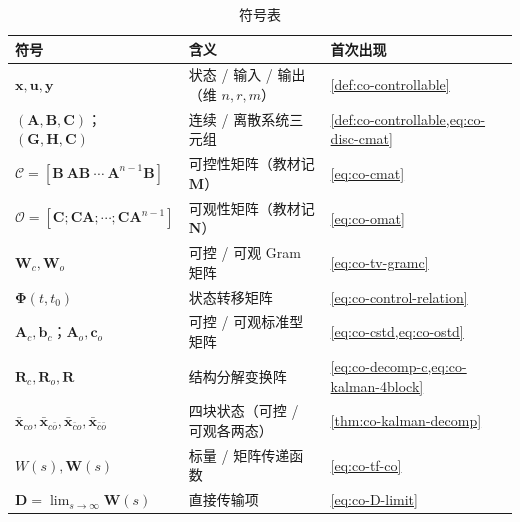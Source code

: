 \begin{table}[H]\centering\small
\caption{符号表}
\begin{tabular}{lll}
\toprule
符号 & 含义 & 首次出现 \\
\midrule
$\mathbf{x},\mathbf{u},\mathbf{y}$ & 状态 / 输入 / 输出（维 $n,r,m$） & \cref{def:co-controllable} \\
$(\mathbf{A},\mathbf{B},\mathbf{C})$；$(\mathbf{G},\mathbf{H},\mathbf{C})$ & 连续 / 离散系统三元组 & \cref{def:co-controllable,eq:co-disc-cmat} \\
$\mathcal{C}=[\mathbf{B}\ \mathbf{A}\mathbf{B}\ \cdots\ \mathbf{A}^{n-1}\mathbf{B}]$ & 可控性矩阵（教材记 $\mathbf{M}$） & \cref{eq:co-cmat} \\
$\mathcal{O}=[\mathbf{C};\mathbf{C}\mathbf{A};\cdots;\mathbf{C}\mathbf{A}^{n-1}]$ & 可观性矩阵（教材记 $\mathbf{N}$） & \cref{eq:co-omat} \\
$\mathbf{W}_c,\mathbf{W}_o$ & 可控 / 可观 Gram 矩阵 & \cref{eq:co-tv-gramc} \\
$\boldsymbol{\Phi}(t,t_0)$ & 状态转移矩阵 & \cref{eq:co-control-relation} \\
$\mathbf{A}_c,\mathbf{b}_c$；$\mathbf{A}_o,\mathbf{c}_o$ & 可控 / 可观标准型矩阵 & \cref{eq:co-cstd,eq:co-ostd} \\
$\mathbf{R}_c,\mathbf{R}_o,\mathbf{R}$ & 结构分解变换阵 & \cref{eq:co-decomp-c,eq:co-kalman-4block} \\
$\bar{\mathbf{x}}_{co},\bar{\mathbf{x}}_{c\bar o},\bar{\mathbf{x}}_{\bar c o},\bar{\mathbf{x}}_{\bar c\bar o}$ & 四块状态（可控 / 可观各两态） & \cref{thm:co-kalman-decomp} \\
$W(s),\mathbf{W}(s)$ & 标量 / 矩阵传递函数 & \cref{eq:co-tf-co} \\
$\mathbf{D}=\lim_{s\to\infty}\mathbf{W}(s)$ & 直接传输项 & \cref{eq:co-D-limit} \\
\bottomrule
\end{tabular}
\end{table}

